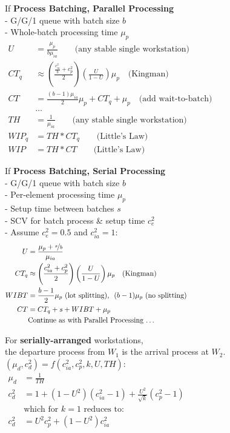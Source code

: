 \documentclass[11pt]{article}
\begin{document}
\newpage

\noindent  If \textbf{Process Batching, Parallel Processing}\\
\noindent  - G/G/1 queue with batch size $b$\\
\noindent  - Whole-batch processing time $\mu_p$
\begin{align*}
U 		&= \frac{\mu_p}{b \mu_{ia}}		\qquad	\text{(any stable single workstation)}\\
CT_q	&\approx \left( \frac{\frac{c_{ia}^2}{b} + c_p^2}{2} \right)  \left( \frac{U}{1-U} \right)  \mu_p 	\quad	\text{(Kingman)}\\
CT		&= \frac{(b-1)\mu_{ia}}{2}\mu_p + CT_q + \mu_p 	\quad \text{(add wait-to-batch)} \qquad \qquad \qquad \qquad \qquad \qquad \qquad \qquad\\
		&\hdots\\
TH		&= \frac{1}{\mu_{ia}}	\qquad	\text{(any stable single workstation)}\\
WIP_q	&= TH * CT_q	\qquad	\text{(Little's Law)}\\
WIP	&= TH * CT	\qquad	\text{(Little's Law)}
\end{align*}

\noindent  If \textbf{Process Batching, Serial Processing}\\
\noindent  - G/G/1 queue with batch size $b$\\
\noindent  - Per-element processing time $\mu_p$\\
\noindent  - Setup time between batches $s$\\
\noindent  - SCV for batch process \& setup time $c_e^2$\\
\noindent  - Assume $c_e^2=0.5$ and $c_{ia}^2=1$:
\begin{align*}
U 		&= \frac{\mu_p + \nicefrac{s}{b}}{\mu_{ia}}\\
CT_q	&\approx \left( \frac{c_{ia}^2 + c_p^2}{2} \right)  \left( \frac{U}{1-U} \right)  \mu_p 	\quad \text{(Kingman)}\\
WIBT	&= \frac{b-1}{2} \mu_p \text{ (lot splitting),} ~~ (b-1) \mu_p \text{ (no splitting)} \qquad \qquad \qquad \qquad \qquad \quad \qquad \qquad \qquad\\
CT		&= CT_q + s + WIBT + \mu_p\\
		&\text{Continue as with Parallel Processing \ldots}
\end{align*}


\newpage

\noindent  For \textbf{serially-arranged} workstations,\\
\noindent  the departure process from $W_1$ is the arrival process at $W_2$.\\
$(\mu_d, c_d^2) = f(c_{ia}^2, c_p^2, k, U, TH)$:
\begin{align*}
\mu_d 	&= \frac{1}{TH}\\
c_d^2 	&= 1 + (1-U^2)(c_{ia}^2-1) + \frac{U^2}{\sqrt{k}}(c_p^2-1) \qquad \qquad \qquad \qquad \qquad \qquad \qquad \qquad \qquad\\
		&\text{which for $k=1$ reduces to:} \\
c_d^2 	&= U^2 c_p^2 + (1-U^2)c_{ia}^2
\end{align*}
\end{document}
